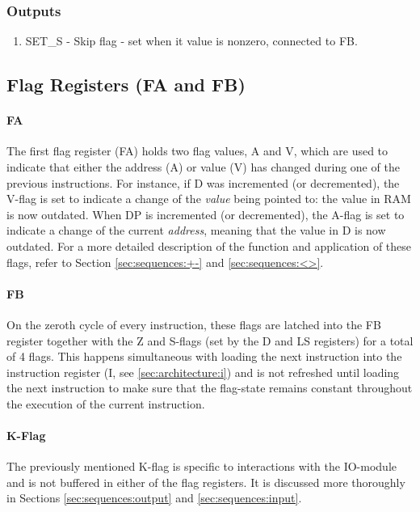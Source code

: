 \subsubsection*{Outputs}
\begin{enumerate}
\itemsep0em 
\item SET\_S - Skip flag - set when it value is nonzero, connected to FB.
\end{enumerate}

\subsection{Flag Registers (FA and FB)} \label{sec:architecture:flags}
\paragraph{FA} The first flag register (FA) holds two flag values, A and V, which are used to indicate that either the address (A) or value (V) has changed during one of the previous instructions. For instance, if D was incremented (or decremented), the V-flag is set to indicate a change of the \emph{value} being pointed to: the value in RAM is now outdated. When DP is incremented (or decremented), the A-flag is set to indicate a change of the current \emph{address}, meaning that the value in D is now outdated. For a more detailed description of the function and application of these flags, refer to Section \ref{sec:sequences:+-} and \ref{sec:sequences:<>}.

\paragraph{FB} On the zeroth cycle of every instruction, these flags are latched into the FB register together with the Z and S-flags (set by the D and LS registers) for a total of 4 flags. This happens simultaneous with loading the next instruction into the instruction register (I, see \ref{sec:architecture:i}) and is not refreshed until loading the next instruction to make sure that the flag-state remains constant throughout the execution of the current instruction.

\paragraph{K-Flag} The previously mentioned K-flag is specific to interactions with the IO-module and is not buffered in either of the flag registers. It is discussed more thoroughly in Sections \ref{sec:sequences:output} and \ref{sec:sequences:input}.

